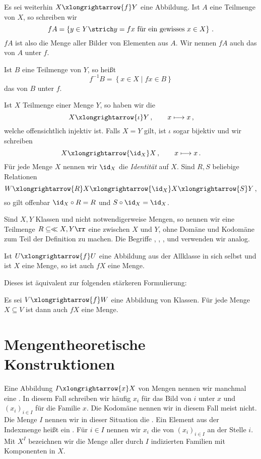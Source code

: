 Es sei weiterhin $X\xlongrightarrow{f}Y$ eine Abbildung. Ist $A$ eine Teilmenge von $X$, so schreiben wir 
\[fA=\left\{y\in Y\strich y=fx\text{ für ein gewisses }x\in X\right\}\,.\]
$fA$ ist also die Menge aller Bilder von Elementen aus $A$. Wir nennen $fA$ auch das  von $A$ unter $f$.

Ist $B$ eine Teilmenge von $Y$, so heißt
\[
f^{-1}B=\left\{x\in X\mid fx\in B\right\}
\]
das  von $B$ unter $f$.

\begin{example}
Ist $X$ Teilmenge einer Menge $Y$, so haben wir die 
\[
X\xlongrightarrow{\iota}Y\,,\qquad x\longmapsto x\,,
\]
welche offensichtlich injektiv ist. Falls $X=Y$ gilt, ist $\iota$ sogar bijektiv und wir schreiben
\[
X\xlongrightarrow{\id_X}X\,,\qquad x\longmapsto x\,.
\]
Für jede Menge $X$ nennen wir $\id_X$ die \emph{Identität} auf $X$. Sind $R,S$ beliebige Relationen
\[
W\xlongrightarrow{R}X\xlongrightarrow{\id_X}X\xlongrightarrow{S}Y\,,
\]
so gilt offenbar $\id_X\circ R=R$ und $S\circ\id_X=\id_X$.
\end{example}

Sind $X,Y$ Klassen und nicht notwendigerweise Mengen, so nennen wir eine Teilmenge $R\subseteq\ll X,Y\rr$ eine  zwischen $X$ und $Y$, ohne Domäne und Kodomäne zum Teil der Definition zu machen. Die Begriffe , , ,  und  verwenden wir analog.

\begin{axiom}
Ist $U\xlongrightarrow{f}U$ eine Abbildung aus der Allklasse in sich selbst und ist $X$ eine Menge, so ist auch $fX$ eine Menge.
\end{axiom}

Dieses  ist äquivalent zur folgenden stärkeren Formulierung:

\begin{task}
Es sei $V\xlongrightarrow{f}W$ eine Abbildung von Klassen. Für jede Menge $X\subseteq V$ ist dann auch $fX$ eine Menge. 
\end{task}

\section{Mengentheoretische Konstruktionen}

Eine Abbildung $I\xlongrightarrow{x}X$ von Mengen nennen wir manchmal eine . In diesem Fall schreiben wir häufig $x_i$ für das Bild von $i$ unter $x$ und $(x_i)_{i\in I}$ für die Familie $x$. Die Kodomäne nennen wir in diesem Fall meist nicht. Die Menge $I$ nennen wir in dieser Situation die . Ein Element aus der Indexmenge heißt ein . Für $i\in I$ nennen wir $x_i$ die  von $(x_i)_{i\in I}$ an der Stelle $i$. Mit $X^I$ bezeichnen wir die Menge aller durch $I$ indizierten Familien mit Komponenten in $X$. 

